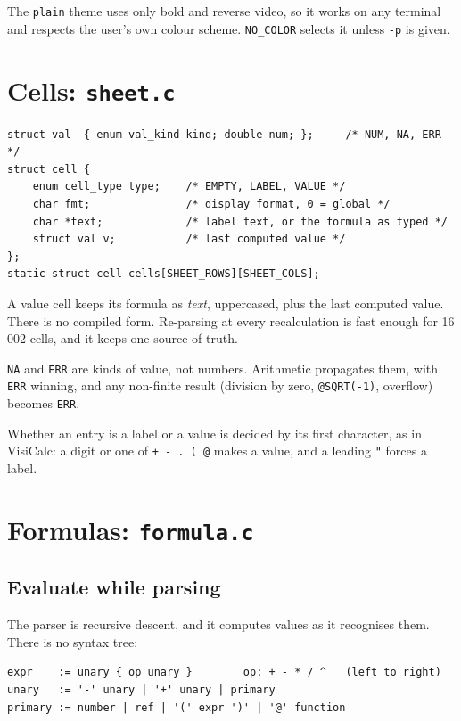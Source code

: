 \documentclass[11pt]{article}
\begin{document}
The \texttt{plain} theme uses only bold and reverse video, so it works on
any terminal and respects the user's own colour scheme. \texttt{NO\_COLOR}
selects it unless \texttt{-p} is given.

\section{Cells: \texttt{sheet.c}}

\begin{lstlisting}[style=c]
struct val  { enum val_kind kind; double num; };     /* NUM, NA, ERR */
struct cell {
    enum cell_type type;    /* EMPTY, LABEL, VALUE */
    char fmt;               /* display format, 0 = global */
    char *text;             /* label text, or the formula as typed */
    struct val v;           /* last computed value */
};
static struct cell cells[SHEET_ROWS][SHEET_COLS];
\end{lstlisting}

A value cell keeps its formula as \emph{text}, uppercased, plus the last
computed value. There is no compiled form. Re-parsing at every
recalculation is fast enough for 16\,002 cells, and it keeps one source of
truth.

\texttt{NA} and \texttt{ERR} are kinds of value, not numbers. Arithmetic
propagates them, with \texttt{ERR} winning, and any non-finite result
(division by zero, \texttt{@SQRT(-1)}, overflow) becomes \texttt{ERR}.

Whether an entry is a label or a value is decided by its first character,
as in VisiCalc: a digit or one of \texttt{+ - . ( @} makes a value, and a
leading \texttt{"} forces a label.

\section{Formulas: \texttt{formula.c}}

\subsection{Evaluate while parsing}

The parser is recursive descent, and it computes values as it recognises
them. There is no syntax tree:

\begin{lstlisting}
expr    := unary { op unary }        op: + - * / ^   (left to right)
unary   := '-' unary | '+' unary | primary
primary := number | ref | '(' expr ')' | '@' function
\end{lstlisting}
\end{document}
